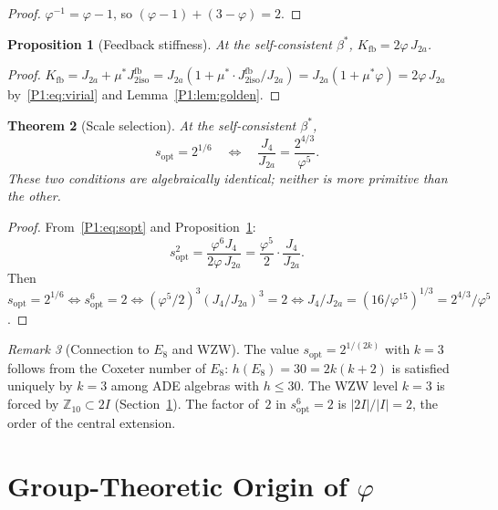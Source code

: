 \documentclass[11pt,a4paper]{article}
\newtheorem{theorem}{Theorem}[section]
\newtheorem{proposition}[theorem]{Proposition}
\theoremstyle{definition}
\theoremstyle{remark}
\newtheorem{remark}[theorem]{Remark}
\newcommand{\vp}{\varphi}
\newcommand{\ms}{\mu^{*}}
\newcommand{\bst}{\beta^{*}}
\newcommand{\Kfb}{K_{\mathrm{fb}}}
\newcommand{\Jfb}{J_{2\mathrm{iso}}^{\mathrm{fb}}}
\newcommand{\Ja}{J_{2a}}
\newcommand{\Jfour}{J_{4}}
\newcommand{\sopt}{s_{\mathrm{opt}}}
\begin{document}
\begin{proof}
$\vp^{-1} = \vp - 1$, so $(\vp-1)+(3-\vp) = 2$.
\end{proof}

\begin{proposition}[Feedback stiffness]
\label{P1:prop:Kfb}
At the self-consistent $\bst$,
$\Kfb = 2\vp\,\Ja$.
\end{proposition}

\begin{proof}
$\Kfb = \Ja + \ms\Jfb = \Ja(1 + \ms\cdot\Jfb/\Ja) = \Ja(1+\ms\vp) = 2\vp\,\Ja$
by~\eqref{P1:eq:virial} and Lemma~\ref{P1:lem:golden}.
\end{proof}

\begin{theorem}[Scale selection]
\label{P1:thm:scale}
At the self-consistent $\bst$,
\begin{equation}
  \sopt = 2^{1/6}
  \quad\Longleftrightarrow\quad
  \frac{\Jfour}{\Ja} = \frac{2^{4/3}}{\vp^{5}}.
  \label{P1:eq:equiv}
\end{equation}
These two conditions are algebraically identical; neither is more primitive
than the other.
\end{theorem}

\begin{proof}
From~\eqref{P1:eq:sopt} and Proposition~\ref{P1:prop:Kfb}:
\[
  \sopt^{2} = \frac{\vp^{6}\Jfour}{2\vp\,\Ja} = \frac{\vp^{5}}{2}\cdot\frac{\Jfour}{\Ja}.
\]
Then $\sopt=2^{1/6}\Leftrightarrow\sopt^{6}=2\Leftrightarrow
(\vp^{5}/2)^{3}(\Jfour/\Ja)^{3}=2\Leftrightarrow\Jfour/\Ja = (16/\vp^{15})^{1/3}
= 2^{4/3}/\vp^{5}$.
\end{proof}

\begin{remark}[Connection to $E_8$ and WZW]
\label{P1:rem:e8}
The value $\sopt = 2^{1/(2k)}$ with $k=3$ follows from the Coxeter number
of $E_8$: $h(E_8) = 30 = 2k(k+2)$ is satisfied uniquely by $k=3$ among
ADE algebras with $h\leq 30$.  The WZW level $k=3$ is forced by
$\mathbb{Z}_{10}\subset 2I$ (Section~\ref{P1:sec:group}).  The factor of~$2$
in $\sopt^{6}=2$ is $|2I|/|I|=2$, the order of the central extension.
\end{remark}

\section{Group-Theoretic Origin of $\varphi$}
\label{P1:sec:group}
\end{document}
